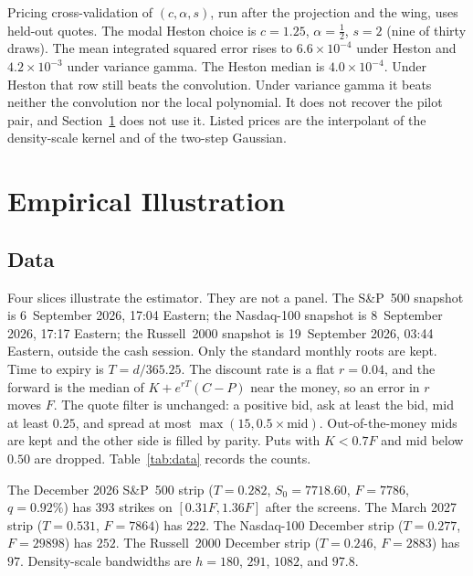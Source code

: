 \documentclass[preprint,12pt,authoryear,times]{elsarticle}
\begin{document}
Pricing cross-validation of \((c,\alpha,s)\), run after the projection and the wing, uses held-out quotes. The modal Heston choice is \(c=1.25\), \(\alpha=\tfrac12\), \(s=2\) (nine of thirty draws). The mean integrated squared error rises to \(6.6\times 10^{-4}\) under Heston and \(4.2\times 10^{-3}\) under variance gamma. The Heston median is \(4.0\times 10^{-4}\). Under Heston that row still beats the convolution. Under variance gamma it beats neither the convolution nor the local polynomial. It does not recover the pilot pair, and Section~\ref{sec:emp} does not use it. Listed prices are the interpolant of the density-scale kernel and of the two-step Gaussian.

\section{Empirical Illustration}
\label{sec:emp}

\subsection{Data}
\label{sec:data}

Four slices illustrate the estimator. They are not a panel. The S\&P~500 snapshot is 6~September 2026, 17:04 Eastern; the Nasdaq-100 snapshot is 8~September 2026, 17:17 Eastern; the Russell~2000 snapshot is 19~September 2026, 03:44 Eastern, outside the cash session. Only the standard monthly roots are kept. Time to expiry is \(T=d/365.25\). The discount rate is a flat \(r=0.04\), and the forward is the median of \(K+e^{rT}(C-P)\) near the money, so an error in \(r\) moves \(F\). The quote filter is unchanged: a positive bid, ask at least the bid, mid at least \(0.25\), and spread at most \(\max(15,0.5\times\mathrm{mid})\). Out-of-the-money mids are kept and the other side is filled by parity. Puts with \(K<0.7F\) and mid below \(0.50\) are dropped. Table~\ref{tab:data} records the counts.

The December 2026 S\&P~500 strip (\(T=0.282\), \(S_0=7718.60\), \(F=7786\), \(q=0.92\%\)) has \(393\) strikes on \([0.31F,1.36F]\) after the screens. The March 2027 strip (\(T=0.531\), \(F=7864\)) has \(222\). The Nasdaq-100 December strip (\(T=0.277\), \(F=29898\)) has \(252\). The Russell~2000 December strip (\(T=0.246\), \(F=2883\)) has \(97\). Density-scale bandwidths are \(h=180\), \(291\), \(1082\), and \(97.8\).
\end{document}
